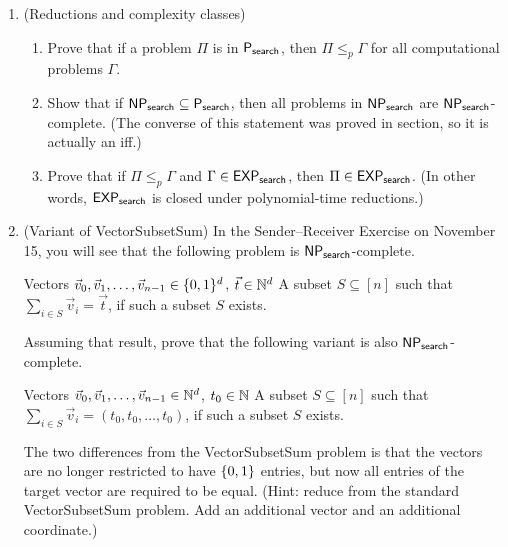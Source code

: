 \documentclass[11pt]{article}
\begin{document}
\begin{enumerate}
    \item (Reductions and complexity classes)  
    \begin{enumerate}
        \item Prove that if a problem $\Pi$ is in $\mathsf{P_{search}}$, then $\Pi\leq_p \Gamma$ for all computational problems $\Gamma$.
        \item Show that if $\mathsf{NP_{search}}\subseteq \mathsf{P_{search}}$, then all problems in $\mathsf{NP_{search}}$ are $\mathsf{NP_{search}}$-complete.  (The converse of this statement was proved in section, so it is actually an iff.)
        \item  Prove that if 
$\Pi\leq_p \Gamma$ and $\Gamma\in \mathsf{EXP_{search}}$, then $\Pi\in \mathsf{EXP_{search}}$. (In other words, $\mathsf{EXP_{search}}$ is closed under polynomial-time reductions.) 
    \end{enumerate}

\newpage

\item (Variant of VectorSubsetSum)  
In the Sender--Receiver Exercise on November 15, you will see that the following problem is $\mathsf{NP_{search}}$-complete.

{Vectors $\vec{v}_0,\vec{v}_1,\ldots,\vec{v}_{n-1}\in \{0,1\}^d$, $\vec{t}\in \mathbb{N}^d$}
{A subset $S\subseteq [n]$ such that $\sum_{i\in S}\vec{v}_i = \vec{t}$, if such a subset $S$ exists.}

Assuming that result, prove that the following variant is also $\mathsf{NP_{search}}$-complete.
    
{Vectors $\vec{v}_0,\vec{v}_1,\ldots,\vec{v}_{n-1}\in \mathbb{N}^d$, $t_0\in \mathbb{N}$}
{A subset $S\subseteq [n]$ such that $\sum_{i\in S}\vec{v}_i = (t_0,t_0,\ldots,t_0)$, if such a subset $S$ exists.}

    The two differences from the VectorSubsetSum problem is that the vectors are no longer restricted to have $\{0,1\}$ entries, but now all entries of the target vector are required to be equal. (Hint: reduce from the standard VectorSubsetSum problem.  Add an additional vector and an additional coordinate.)

    \end{enumerate}
\end{document}
